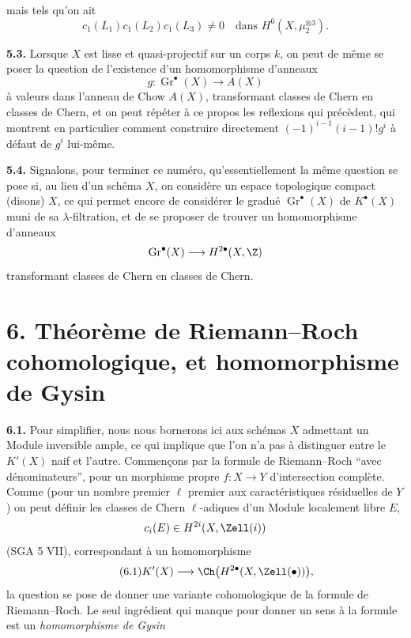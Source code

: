 mais tels qu'on ait
\[
 c_1(L_1)c_1(L_2)c_1(L_3)\ne0
 \quad\text{dans }H^6(X,\mu_2^{\otimes3}).
\]

\textbf{5.3.} Lorsque $X$ est lisse et quasi-projectif sur un corps $k$, on peut de même se poser la question de l'existence d'un homomorphisme d'anneaux
\[
 g:\operatorname{Gr}^\bullet(X)\longrightarrow A(X)
\]
à valeurs dans l'anneau de Chow $A(X)$, transformant classes de Chern en classes de Chern, et on peut répéter à ce propos les reflexions qui précèdent, qui montrent en particulier comment construire directement $(-1)^{i-1}(i-1)!g^i$ à défaut de $g^i$ lui-même.

\textbf{5.4.} Signalons, pour terminer ce numéro, qu'essentiellement la même question se pose si, au lieu d'un schéma $X$, on considère un espace topologique compact (disons) $X$, ce qui permet encore de considérer le gradué $\operatorname{Gr}^\bullet(X)$ de $K^\bullet(X)$ muni de sa $\lambda$-filtration, et de se proposer de trouver un homomorphisme d'anneaux
\[
 \operatorname{Gr}^\bullet(X)\longrightarrow H^{2\bullet}(X,\Z)
\]
transformant classes de Chern en classes de Chern.

\section*{6. Théorème de Riemann--Roch cohomologique, et homomorphisme de Gysin}

\textbf{6.1.} Pour simplifier, nous nous bornerons ici aux schémas $X$ admettant un Module inversible ample, ce qui implique que l'on n'a pas à distinguer entre le $K'(X)$ naif et l'autre. Commençons par la formule de Riemann--Roch ``avec dénominateurs'', pour un morphisme propre $f:X\to Y$ d'intersection complète. Comme (pour un nombre premier $\ell$ premier aux caractéristiques résiduelles de $Y$) on peut définir les classes de Chern $\ell$-adiques d'un Module localement libre $E$,
\[
 c_i(E)\in H^{2i}(X,\Zell(i))
\]
(SGA 5 VII), correspondant à un homomorphisme
\begin{equation}\tag{6.1}
 K'(X)\longrightarrow \Ch\bigl(H^{2\bullet}(X,\Zell(\bullet))\bigr),
\end{equation}
la question se pose de donner une variante cohomologique de la formule de Riemann--Roch. Le seul ingrédient qui manque pour donner un sens à la formule est un \emph{homomorphisme de Gysin}
